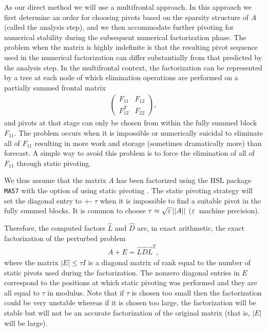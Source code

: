 \documentclass{siamltex}
\newcommand{\um}{{\bf \varepsilon }\,}
\begin{document}
As our direct method we will use a multifrontal approach.  In this approach
we first determine an order for choosing pivots based on the sparsity
structure of $A$ (called the analysis step), and we then accommodate further
pivoting for numerical
stability during the subsequent numerical factorization phase.  The problem
when the matrix is highly indefinite is that the resulting pivot sequence
used in the numerical factorization can differ substantially from that
predicted by the analysis step.  In the multifrontal context, the
factorization can be represented by a tree at each node of which elimination
operations are performed on a partially summed frontal matrix
\begin{eqnarray}\label{multifrontal}
\left ( {\begin{array} {ll} F_{11} & F_{12} \\ F_{12}^T & F_{22} \end{array}}
\right ),
\end{eqnarray}
and pivots at that stage can only be chosen from within the fully summed block
$F_{11}$. The problem occurs when it is impossible or numerically suicidal
to eliminate all of $F_{11}$ resulting in more work and storage (sometimes
dramatically more) than forecast.  A simple way to avoid this problem
is to force the elimination of all of $F_{11}$ through static pivoting.

We thus assume that the matrix $A$ has been factorized using the HSL package
{\tt MA57}
with the option of using static pivoting \cite{dupr:05}. The static pivoting
strategy will set the diagonal entry to +- $\tau$
when it is impossible to find a suitable pivot in the fully summed blocks.
It is common to choose $\tau \approx \sqrt{\um} ||A||$ ($\um$ machine
precision).

Therefore, the computed factors $\hat{L}$ and $\hat{D}$ are, in exact
arithmetic, the exact factorization
of the perturbed problem
\begin{eqnarray}\label{A_per}
A + E = \hat{L} \hat{D} \hat{L}^T,
\end{eqnarray}
where the matrix $|E| \le \tau  I$ is a diagonal matrix of rank equal to the
number of static pivots used during the factorization. The nonzero diagonal
entries in $E$
correspond to the positions at which  static pivoting was performed and they
are all equal to $\tau$ in modulus. Note that if $\tau$ is chosen too small
then the
factorization could be very unstable whereas if it is chosen too large, the
factorization will be stable but will not be an accurate factorization of the
original matrix (that is, $|E|$ will be large).
\end{document}
